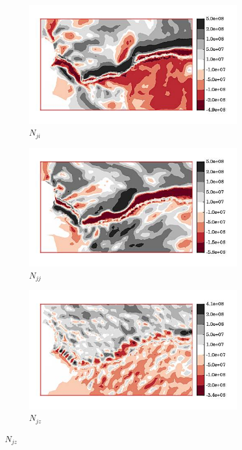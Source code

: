 \begin{figure}
  \begin{subfigure}[b]{0.32\linewidth}
    \includegraphics[width=\linewidth]{images/internal_energy/jakob_results/inversion_Wc_0.01/stress_balance/N_ji.jpg}
  \caption{$N_{ji}$}
  \label{N_ji}
  \end{subfigure}
  \begin{subfigure}[b]{0.32\linewidth}
    \includegraphics[width=\linewidth]{images/internal_energy/jakob_results/inversion_Wc_0.01/stress_balance/N_jj.jpg}
  \caption{$N_{jj}$}
  \label{N_jj}
  \end{subfigure}
  \begin{subfigure}[b]{0.32\linewidth}
    \includegraphics[width=\linewidth]{images/internal_energy/jakob_results/inversion_Wc_0.01/stress_balance/N_jz.jpg}
  \caption{$N_{jz}$}
  \label{N_jz}
  \end{subfigure}


\end{figure}
